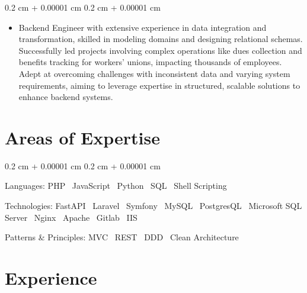 \documentclass[10pt, letterpaper]{article}
\newenvironment{highlightsforbulletentries}{
    \begin{itemize}[
        topsep=0.10 cm,
        parsep=0.10 cm,
        partopsep=0pt,
        itemsep=0pt,
        leftmargin=10pt
    ]
}{
    \end{itemize}
} %
\newenvironment{onecolentry}{
    \begin{adjustwidth}{
        0.2 cm + 0.00001 cm
    }{
        0.2 cm + 0.00001 cm
    }
}{
    \end{adjustwidth}
} %
\begin{document}
    \begin{onecolentry}
        \begin{highlightsforbulletentries}

        
            \item Backend Engineer with extensive experience in data integration and transformation, skilled in modeling domains and designing relational schemas. Successfully led projects involving complex operations like dues collection and benefits tracking for workers' unions, impacting thousands of employees. Adept at overcoming challenges with inconsistent data and varying system requirements, aiming to leverage expertise in structured, scalable solutions to enhance backend systems.
        

        \end{highlightsforbulletentries}
    \end{onecolentry}

    \section{Areas of Expertise}


        \begin{onecolentry}
        
                Languages: PHP \textbar\ JavaScript \textbar\ Python \textbar\ SQL \textbar\ Shell Scripting
        
                Technologies: FastAPI \textbar\ Laravel \textbar\ Symfony \textbar\ MySQL \textbar\ PostgresQL \textbar\ Microsoft SQL Server \textbar\ Nginx \textbar\ Apache \textbar\ Gitlab \textbar\ IIS
        
                Patterns \& Principles: MVC \textbar\ REST \textbar\ DDD \textbar\ Clean Architecture
        
        \end{onecolentry}
        \vspace{0.2 cm}

    \section{Experience}

        
\end{document}
